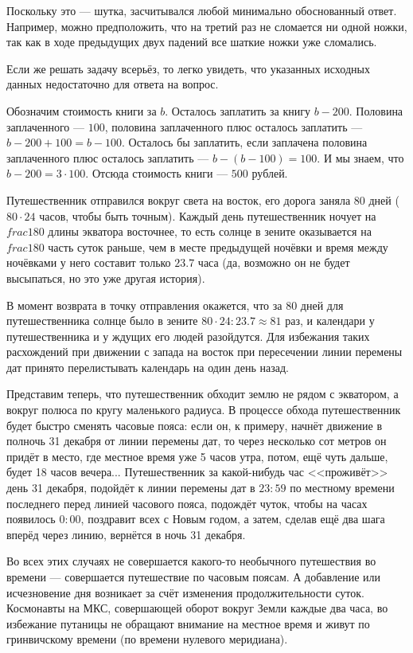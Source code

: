 \begin{itemize}

\itA Поскольку это --- шутка, засчитывался любой минимально обоснованный ответ. 
Например, можно предположить, что на третий раз не сломается ни одной ножки, 
так как в ходе предыдущих двух падений все шаткие ножки уже сломались. 

Если же решать задачу всерьёз, то легко увидеть, что указанных исходных данных
недостаточно для ответа на вопрос. 

\itB Обозначим стоимость книги за $b$. Осталось заплатить за книгу $b - 200$.
Половина заплаченного --- $100$, половина заплаченного плюс осталось заплатить ---
$b - 200 + 100 = b - 100$. Осталось бы заплатить, если заплачена половина 
заплаченного плюс осталось заплатить --- $b - (b - 100) = 100$.
И мы знаем, что $b - 200 = 3 \cdot 100$. Отсюда стоимость книги --- $500$ рублей.

\itC Путешественник отправился вокруг света на восток, его дорога 
заняла $80$ дней ($80 \cdot 24$ часов, чтобы быть точным). 
Каждый день путешественник ночует на $frac{1}{80}$ длины 
экватора восточнее, то есть солнце в зените оказывается на $frac{1}{80}$ часть
суток раньше, чем в месте предыдущей ночёвки и время между 
ночёвками у него составит только $23.7$ часа (да, возможно он не будет 
высыпаться, но это уже другая история). 

В момент возврата в точку отправления окажется, что за $80$ дней для путешественника
солнце было в зените $80 \cdot 24 : 23.7 \approx 81$ раз, и календари у путешественника
и у ждущих его людей разойдутся. Для избежания таких расхождений при движении с запада на восток
при пересечении линии перемены дат принято перелистывать календарь на один день назад.

Представим теперь, что путешественник обходит землю не рядом с экватором, 
а вокруг полюса по кругу маленького радиуса. В процессе обхода путешественник 
будет быстро сменять часовые пояса: если он, к примеру, начнёт движение в полночь 
31 декабря от линии перемены дат, то через несколько сот метров он придёт в место, 
где местное время уже 5 часов утра, потом, ещё чуть дальше, 
будет 18 часов вечера... Путешественник за какой-нибудь час <<проживёт>> день 31 декабря, 
подойдёт к линии перемены дат в $23:59$ по местному времени последнего перед 
линией часового пояса, подождёт чуток, чтобы на часах появилось
$0:00$, поздравит всех с Новым годом, а затем, сделав ещё два шага вперёд 
через линию, вернётся в ночь 31 декабря. 

Во всех этих случаях не совершается какого-то необычного путешествия во 
времени --- совершается путешествие по часовым поясам. 
А добавление или исчезновение 
дня возникает за счёт изменения продолжительности суток. Космонавты на МКС,
совершающей оборот вокруг Земли каждые два часа, во избежание путаницы не
обращают внимание на местное время и живут по гринвичскому времени (по времени
нулевого меридиана).
\end{itemize}
